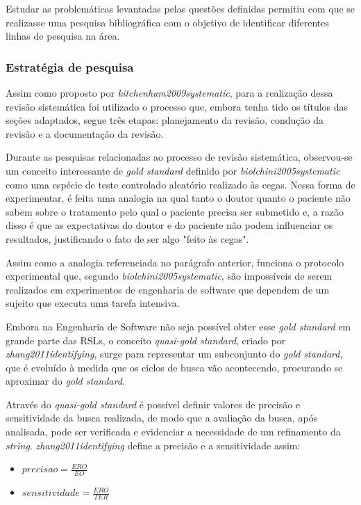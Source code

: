 \par Estudar as problemáticas levantadas pelas questões definidas permitiu com que se realizasse uma pesquisa bibliográfica com o objetivo de identificar diferentes linhas de pesquisa na área. 

\subsubsection{Estratégia de pesquisa}

Assim como proposto por \textit{kitchenham2009systematic}, para a realização dessa revisão sistemática foi utilizado o processo que, embora tenha tido os títulos das seções adaptados, segue três etapas: planejamento da revisão, condução da revisão e a documentação da revisão. 

Durante as pesquisas relacionadas ao processo de revisão sistemática, observou-se um conceito interessante de \textit{gold standard} definido por \textit{biolchini2005systematic} como uma espécie de teste controlado aleatório realizado às cegas. Nessa forma de experimentar, é feita uma analogia na qual tanto o doutor quanto o paciente não sabem sobre o tratamento pelo qual o paciente precisa ser submetido e, a razão disso é que as expectativas do doutor e do paciente não podem influenciar os resultados, justificando o fato de ser algo "feito às cegas". 

Assim como a analogia referenciada no parágrafo anterior, funciona o protocolo experimental que, segundo \textit{biolchini2005systematic}, são impossíveis de serem realizados em experimentos de engenharia de software que dependem de um sujeito que executa uma tarefa intensiva. 

Embora na Engenharia de Software não seja possível obter esse \textit{gold standard} em grande parte das RSLs, o conceito \textit{quasi-gold standard}, criado por \textit{zhang2011identifying}, surge para representar um subconjunto do \textit{gold standard}, que é evoluído à medida que os ciclos de busca vão acontecendo, procurando se aproximar do \textit{gold standard}.

Através do \textit{quasi-gold standard} é possível definir valores de precisão e sensitividade da busca realizada, de modo que a avaliação da busca, após analisada, pode ser verificada e evidenciar a necessidade de um refinamento da \textit{string}. \textit{zhang2011identifying} define a precisão e a sensitividade assim:

\begin{itemize}

    \item $precisao = \frac{ERO}{EO}$ 
	\item $sensitividade = \frac{ERO}{TER}$

\end{itemize}

